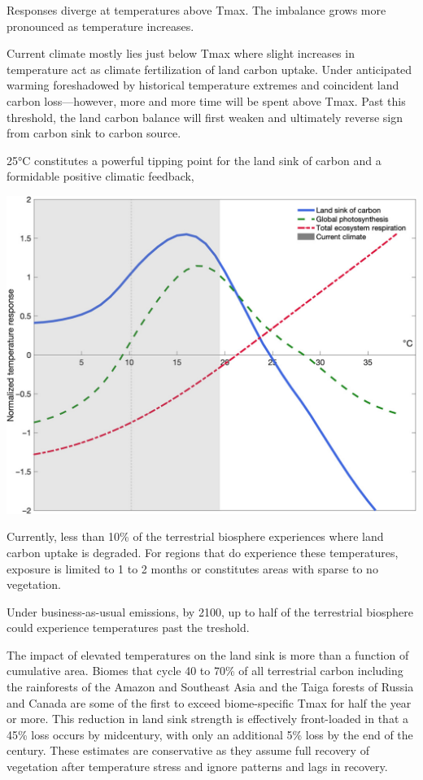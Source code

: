 \documentclass[
]{book}
\begin{document}
Responses diverge at temperatures above Tmax.
The imbalance grows more pronounced as temperature increases.

Current climate mostly lies just below Tmax where slight increases in temperature act as
climate fertilization of land carbon uptake.
Under anticipated warming foreshadowed by historical temperature extremes and coincident
land carbon loss---however, more and more time will be spent above Tmax.
Past this threshold, the land carbon balance will first weaken and
ultimately reverse sign from carbon sink to carbon source.

25°C constitutes a powerful tipping point for the land
sink of carbon and a formidable positive climatic feedback,

\includegraphics{fig/Land_Sink_of_Carbon.jpg}

Currently, less than 10\% of the terrestrial biosphere experiences
where land carbon uptake is degraded.
For regions that do experience these temperatures,
exposure is limited to 1 to 2 months or
constitutes areas with sparse to no vegetation.

Under business-as-usual emissions, by 2100, up to half
of the terrestrial biosphere could experience temperatures past
the treshold.

The impact of elevated temperatures on the land sink is more than a
function of cumulative area.
Biomes that cycle 40 to 70\% of all terrestrial carbon
including the rainforests of the Amazon and Southeast Asia and
the Taiga forests of Russia and Canada
are some of the first to exceed biome-specific Tmax
for half the year or more.
This reduction in land sink strength is effectively front-loaded
in that a 45\% loss occurs by midcentury,
with only an additional 5\% loss by the end of the century.
These estimates are conservative as they assume
full recovery of vegetation after temperature stress and
ignore patterns and lags in recovery.
\end{document}
